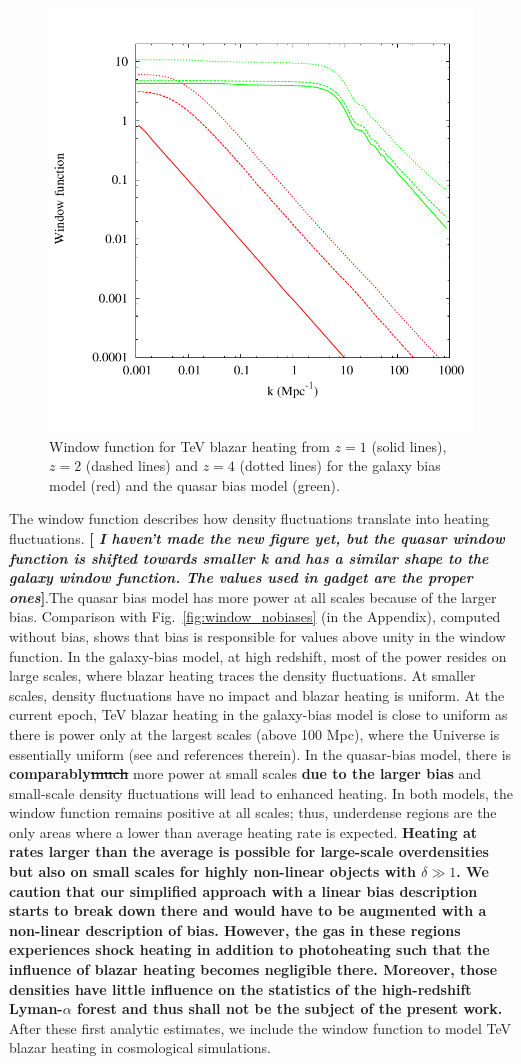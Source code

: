 \documentclass[numberedappendix]{emulateapj}
\newcommand\ALc[1]{{\color{red} \bf #1}} %
\newcommand\Cc[1]{{\color{blue} \bf #1}} %
\begin{document}
\begin{figure}[h]
\centering
\includegraphics[width = .45\textwidth ]{window_gal_qso-eps-converted-to}
\caption{Window function for TeV blazar heating from $z=1$ (solid lines), $z=2$ (dashed lines) and $z=4$ (dotted lines) for the galaxy bias model (red) and the quasar bias model (green).}
\label{fig:window}
\end{figure}
The window function describes how density fluctuations translate into heating fluctuations. \ALc{[{ \em I haven't made the new figure yet, but the quasar window function is shifted towards smaller k and has a similar shape to the galaxy window function. The values used in gadget are the proper ones}]}.The quasar bias model has more power at all scales because of the larger bias. Comparison with Fig.~\ref{fig:window_nobiases} (in the Appendix), computed without bias, shows that bias is responsible for values above unity in the window function. In the galaxy-bias model, at high redshift, most of the power resides on large scales, where blazar heating traces the density fluctuations. At smaller scales, density fluctuations have no impact and blazar heating is uniform. At the current epoch, TeV blazar heating in the galaxy-bias model is close to uniform as there is power only at the largest scales (above 100 Mpc), where the Universe is essentially uniform (see \citet{2013MNRAS.429.2910C} and references therein). In the quasar-bias model, there is \Cc{comparably\sout{much}} more power at small scales \Cc{due to the larger bias} and small-scale density fluctuations will lead to enhanced heating. In both models, the window function remains positive at all scales; thus, underdense regions are the only areas where a lower than average heating rate is expected. \Cc{Heating at rates larger than the average is possible for large-scale overdensities but also on small scales for highly non-linear objects with $\delta\gg1$. We caution that our simplified approach with a linear bias description starts to break down there and would have to be augmented with a non-linear description of bias. However, the gas in these regions experiences shock heating in addition to photoheating such that the influence of blazar heating becomes negligible there. Moreover, those densities have little influence on the statistics of the high-redshift Lyman-$\alpha$ forest and thus shall not be the subject of the present work.} After these first analytic estimates, we include the window function to model TeV blazar heating in cosmological simulations.
\end{document}
